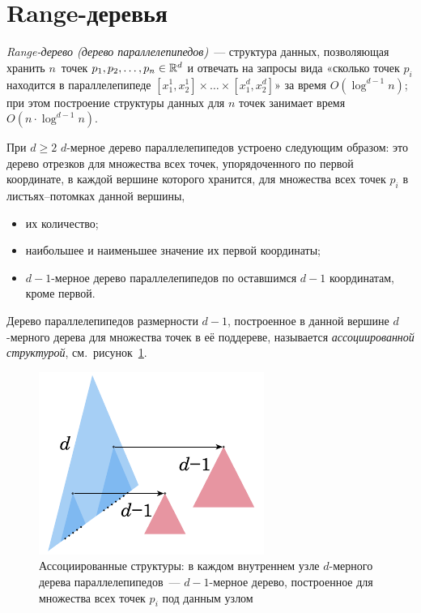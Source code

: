 \documentclass[a4paper,11pt]{article}
\begin{document}
\section{\bf Range-деревья}

\emph{Range-дерево (дерево параллелепипедов)}~— структура данных, позволяющая
хранить \(n\)~то\-чек \(p_1, p_2, \ldots, p_n \in \mathbb R^d\) и отвечать на
запросы вида «сколько точек \(p_i\) находится в параллелепипеде
\([x^1_1, x^1_2] \times \ldots \times [x^d_1, x^d_2]\)»
за время \(O (\log^{d-1} n)\); при этом построение структуры данных
для \(n\) точек занимает время \(O (n \cdot \log^{d-1} n)\).

При \(d \ge 2\) \(d\)-мерное дерево параллелепипедов устроено следующим
образом: это дерево отрезков для множества всех точек, упорядоченного по
первой координате, в каждой вершине которого хранится,
для множества всех точек \(p_i\) в листьях–потомках данной вершины,
\begin{itemize}
  \item их количество;
  \item наибольшее и наименьшее значение их первой координаты;
  \item \(d-1\)-мерное дерево параллелепипедов по оставшимся \(d-1\)
    координатам, кроме первой.
\end{itemize}

Дерево параллелепипедов размерности \(d-1\), построенное в данной
вершине \(d\)-мерного дерева для множества точек в её поддереве,
называется \emph{ассоциированной структурой},
см.~рисунок~\ref{fig:range-tree}.

\begin{figure}[h] \centering
  \includegraphics{img/range-tree}
  \caption{Ассоциированные структуры: в каждом внутреннем узле
    \(d\)-мерного дерева параллелепипедов~— \(d-1\)-мерное
    дерево, построенное для множества всех точек \(p_i\) под данным узлом}
  \label{fig:range-tree}
\end{figure}
\end{document}
